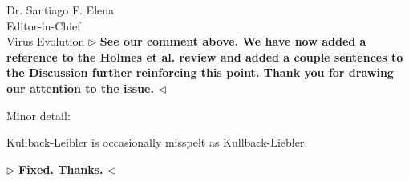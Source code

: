 \documentclass[ucla,biomath,12pt,noaddrfooter,datefrom]{UC_letter}
\newenvironment{reply}{$\triangleright$\bf}{$\triangleleft$}
\begin{document}
\begin{letter}{
Dr. Santiago F. Elena \\
Editor-in-Chief \\
Virus Evolution
}
\begin{reply}
See our comment above.
We have now added a reference to the Holmes et al. review and added a couple sentences to the Discussion further reinforcing this point.
Thank you for drawing our attention to the issue.
\end{reply}

Minor detail:

Kullback-Leibler is occasionally misspelt as Kullback-Liebler.

\begin{reply}
Fixed. Thanks.
\end{reply}

\clearpage


 
\end{letter}
\end{document}
